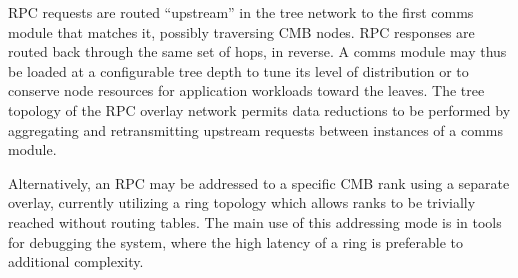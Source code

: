 RPC requests are routed ``upstream'' in the tree network to the first comms module that matches
it, possibly traversing CMB nodes.  RPC responses are routed back through
the same set of hops, in reverse.  A comms module may thus be loaded
at a configurable tree depth to tune its level of distribution
or to conserve node resources for application workloads toward the leaves.
The tree topology of the RPC overlay network permits data reductions to be performed by
aggregating and retransmitting upstream requests between instances of
a comms module.

Alternatively, an RPC may be addressed to a specific CMB rank using a
separate overlay, currently utilizing a ring topology which allows
ranks to be trivially reached without routing tables.  The main use
of this addressing mode is in tools for debugging the system,
where the high latency of a ring is preferable to additional complexity.

%
